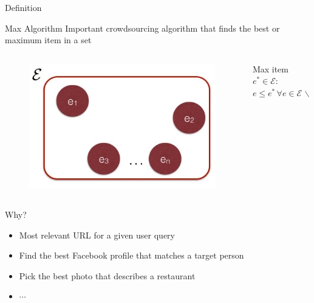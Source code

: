 \documentclass{beamer}
\begin{document}
\begin{frame}{Definition}
	\begin{block}{Max Algorithm}
		Important crowdsourcing algorithm that finds the best or maximum item in a set
	\end{block}
	\pause
	\begin{columns}[T]
	\begin{column}[T]{5cm}
	\begin{figure}
		\centering
		\includegraphics[scale=0.3]{images/set.jpg}
	\end{figure}
	\end{column}
	\begin{column}[T]{5cm}
		\vspace{30pt}
		Max item $e^* \in \mathcal{E}:$\\
		$e \le e^* \hspace{2pt} \forall e \in \mathcal{E} \hspace{1pt} \backslash \lbrace \hspace{1pt} e^* \rbrace$
	\end{column}
	\end{columns}
\end{frame}


\begin{frame}{Why?}
	\begin{itemize}
		\item Most relevant URL for a given user query
		\pause
		\item Find the best Facebook profile that matches a target person
		\pause
		\item Pick the best photo that describes a restaurant
		\item $\cdots$
	\end{itemize}
\end{frame}
\end{document}
